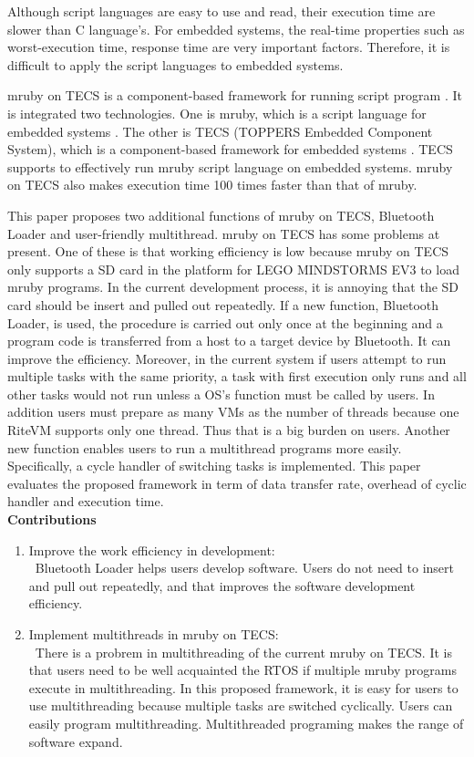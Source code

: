 \documentclass[conference,compsoc]{IEEEtran}
\begin{document}
Although script languages are easy to use and read, their execution time are slower than C language's.
For embedded systems, the real-time properties such as worst-execution time, response time are very important factors.
Therefore, it is difficult to apply the script languages to embedded systems.

mruby on TECS is a component-based framework for running script program \cite{7153813}.
It is integrated two technologies.
One is mruby, which is a script language for embedded systems \cite{5959588}.
The other is TECS (TOPPERS Embedded Component System), which is a component-based framework for embedded systems \cite{4208825}.
TECS supports to effectively run mruby script language on embedded systems.
mruby on TECS also makes execution time 100 times faster than that of mruby.

This paper proposes two additional functions of mruby on TECS, Bluetooth Loader and user-friendly multithread.
mruby on TECS has some problems at present.
One of these is that working efficiency is low because mruby on TECS only supports a SD card in the platform for LEGO MINDSTORMS EV3 to load mruby programs.
In the current development process, it is annoying that the SD card should be insert and pulled out repeatedly.
If a new function, Bluetooth Loader, is used, the procedure is carried out only once at the beginning and a program code is transferred from a host to a target device by Bluetooth.
It can improve the efficiency.
Moreover, in the current system if users attempt to run multiple tasks with the same priority, a task with first execution only runs and all other tasks would not run unless a OS's function must be called by users.
In addition users must prepare as many VMs as the number of threads because one RiteVM supports only one thread.
Thus that is a big burden on users.
Another new function enables users to run a multithread programs more easily.
Specifically, a cycle handler of switching tasks is implemented.
This paper evaluates the proposed framework in term of data transfer rate, overhead of cyclic handler and execution time.
\\

{\bf Contributions}
\begin{enumerate}
\item Improve the work efficiency in development: \mbox{}\\
\ Bluetooth Loader helps users develop software.
Users do not need to insert and pull out repeatedly, and that improves the software development efficiency.
\item Implement multithreads in mruby on TECS: \mbox{}\\
\ There is a probrem in multithreading of the current mruby on TECS.
It is that users need to be well acquainted the RTOS if multiple mruby programs execute in multithreading. 
In this proposed framework, it is easy for users to use multithreading because multiple tasks are switched cyclically.
Users can easily program multithreading.
Multithreaded programing makes the range of software expand.
\end{enumerate}
\end{document}
